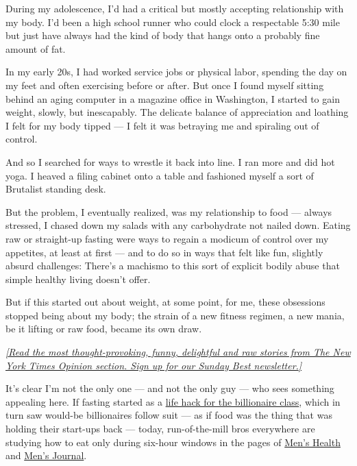 During my adolescence, I'd had a critical but mostly accepting
relationship with my body. I'd been a high school runner who could clock
a respectable 5:30 mile but just have always had the kind of body that
hangs onto a probably fine amount of fat.

In my early 20s, I had worked service jobs or physical labor, spending
the day on my feet and often exercising before or after. But once I
found myself sitting behind an aging computer in a magazine office in
Washington, I started to gain weight, slowly, but inescapably. The
delicate balance of appreciation and loathing I felt for my body tipped
--- I felt it was betraying me and spiraling out of control.

And so I searched for ways to wrestle it back into line. I ran more and
did hot yoga. I heaved a filing cabinet onto a table and fashioned
myself a sort of Brutalist standing desk.

But the problem, I eventually realized, was my relationship to food ---
always stressed, I chased down my salads with any carbohydrate not
nailed down. Eating raw or straight-up fasting were ways to regain a
modicum of control over my appetites, at least at first --- and to do so
in ways that felt like fun, slightly absurd challenges: There's a
machismo to this sort of explicit bodily abuse that simple healthy
living doesn't offer.

But if this started out about weight, at some point, for me, these
obsessions stopped being about my body; the strain of a new fitness
regimen, a new mania, be it lifting or raw food, became its own draw.

\href{https://www.nytimes3xbfgragh.onion/newsletters/sunday-best?action=click\&module=Intentional\&pgtype=Article}{\emph{{[}Read
the most thought-provoking, funny, delightful and raw stories from The
New York Times Opinion section. Sign up for our Sunday Best
newsletter.{]}}}

It's clear I'm not the only one --- and not the only guy --- who sees
something appealing here. If fasting started as a
\href{https://amp.theguardian.com/lifeandstyle/2019/feb/21/extreme-fasting-how-silicon-valley-is-rebranding-eating-disorders?CMP=soc_568\&__twitter_impression=true}{life
hack for the billionaire class}, which in turn saw would-be billionaires
follow suit --- as if food was the thing that was holding their
start-ups back --- today, run-of-the-mill bros everywhere are studying
how to eat only during six-hour windows in the pages of
\href{https://www.menshealth.com/nutrition/a27632073/intermittent-fasting-diet-weight-loss/}{Men's
Health} and
\href{https://www.mensjournal.com/health-fitness/3-types-intermittent-fasting-compared/}{Men's
Journal}.

